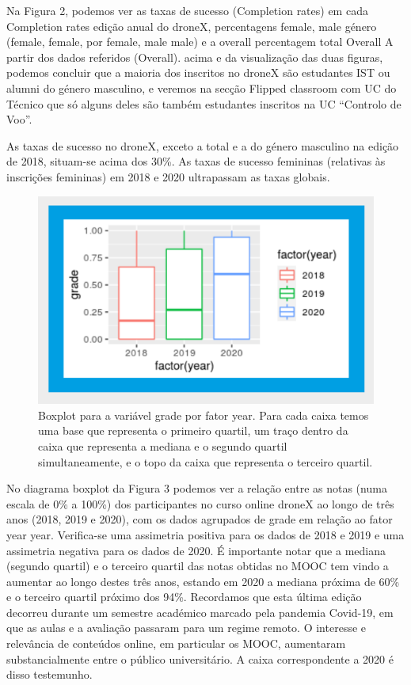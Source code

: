 Na Figura 2, podemos ver as taxas de
sucesso (Completion rates) em cada Completion rates edição anual do droneX, percentagens
female, male género (female, female, por female, male male) e a overall percentagem total Overall A partir dos dados referidos
(Overall). acima e da visualização das duas
figuras, podemos concluir que a maioria dos inscritos no droneX são estudantes IST ou alumni do género masculino, e veremos na secção Flipped classroom com UC do Técnico  que só alguns deles são também estudantes inscritos na UC “Controlo
de Voo”.

As taxas de sucesso no droneX, exceto a total e a do género masculino na edição de 2018, situam-se acima dos 30\%. As taxas de sucesso femininas (relativas às inscrições femininas) em 2018 e 2020 ultrapassam as taxas globais.

\begin{figure}
    \centering
    \includegraphics[width=.9\textwidth]{chaps/Images/boxplot_grade_dronex.png}
    \caption{Boxplot para a variável grade por fator year. Para cada caixa temos uma base que representa o primeiro quartil, um traço dentro da caixa que representa a mediana e o segundo quartil simultaneamente, e o topo da caixa que
representa o terceiro quartil.}
    \label{fig:boxplot_grade_dronex}
\end{figure}

No diagrama boxplot da Figura 3 podemos ver a relação entre as notas (numa escala de 0\% a 100\%) dos participantes no curso online droneX ao longo de três anos (2018, 2019 e 2020), com os dados agrupados de grade em relação ao fator year year. Verifica-se uma assimetria positiva para os dados de 2018 e 2019 e uma
assimetria negativa para os dados de 2020. É
importante notar que a mediana (segundo quartil) e o terceiro quartil das notas obtidas no MOOC tem vindo a aumentar ao longo destes três anos, estando em 2020 a
mediana próxima de 60\% e o terceiro quartil próximo dos 94\%. Recordamos que esta última edição decorreu durante um semestre académico marcado pela pandemia Covid-19, em que as aulas e a avaliação passaram para um regime remoto. O interesse e relevância de conteúdos online, em particular os MOOC, aumentaram substancialmente entre o público universitário. A caixa correspondente a 2020 é disso testemunho.


